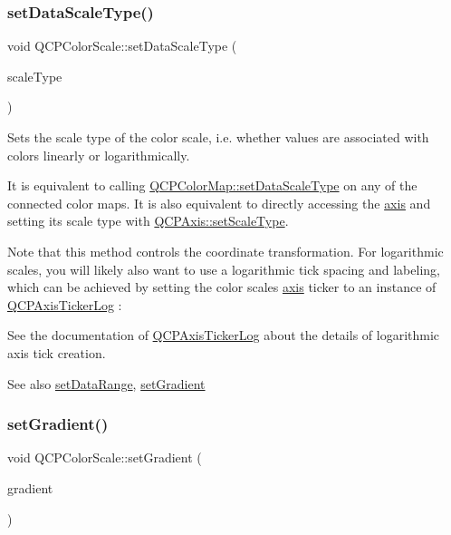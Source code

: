 \subsubsection{\texorpdfstring{set\+Data\+Scale\+Type()}{setDataScaleType()}}
{\footnotesize\ttfamily void Q\+C\+P\+Color\+Scale\+::set\+Data\+Scale\+Type (\begin{DoxyParamCaption}\item[{\hyperlink{classQCPAxis_a36d8e8658dbaa179bf2aeb973db2d6f0}{Q\+C\+P\+Axis\+::\+Scale\+Type}}]{scale\+Type }\end{DoxyParamCaption})}

Sets the scale type of the color scale, i.\+e. whether values are associated with colors linearly or logarithmically.

It is equivalent to calling \hyperlink{classQCPColorMap_a9d20aa08e3c1f20f22908c45b9c06511}{Q\+C\+P\+Color\+Map\+::set\+Data\+Scale\+Type} on any of the connected color maps. It is also equivalent to directly accessing the \hyperlink{classQCPColorScale_a39bdbdb3b212602a5a57f9f3ea444190}{axis} and setting its scale type with \hyperlink{classQCPAxis_adef29cae617af4f519f6c40d1a866ca6}{Q\+C\+P\+Axis\+::set\+Scale\+Type}.

Note that this method controls the coordinate transformation. For logarithmic scales, you will likely also want to use a logarithmic tick spacing and labeling, which can be achieved by setting the color scale\textquotesingle{}s \hyperlink{classQCPColorScale_a39bdbdb3b212602a5a57f9f3ea444190}{axis} ticker to an instance of \hyperlink{classQCPAxisTickerLog}{Q\+C\+P\+Axis\+Ticker\+Log} \+:


\begin{DoxyCodeInclude}
\end{DoxyCodeInclude}
 See the documentation of \hyperlink{classQCPAxisTickerLog}{Q\+C\+P\+Axis\+Ticker\+Log} about the details of logarithmic axis tick creation.

\begin{DoxySeeAlso}{See also}
\hyperlink{classQCPColorScale_abe88633003a26d1e756aa74984587fef}{set\+Data\+Range}, \hyperlink{classQCPColorScale_a1f29583bb6f1e7f473b62fb712be3940}{set\+Gradient} 
\end{DoxySeeAlso}
\mbox{\label{classQCPColorScale_a1f29583bb6f1e7f473b62fb712be3940}} 
\subsubsection{\texorpdfstring{set\+Gradient()}{setGradient()}}
{\footnotesize\ttfamily void Q\+C\+P\+Color\+Scale\+::set\+Gradient (\begin{DoxyParamCaption}\item[{const \hyperlink{classQCPColorGradient}{Q\+C\+P\+Color\+Gradient} \&}]{gradient }\end{DoxyParamCaption})}

